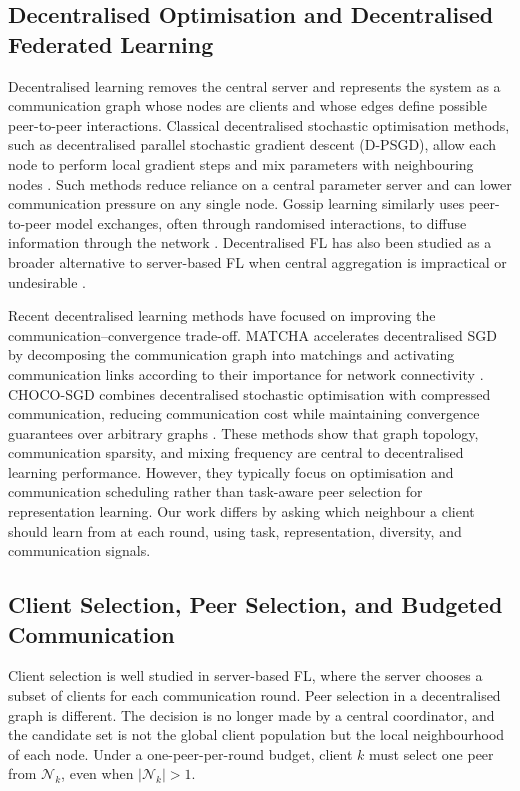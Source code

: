 \documentclass[conference]{IEEEtran}
\begin{document}
\subsection{Decentralised Optimisation and Decentralised Federated Learning}
\label{subsec:decentralised-optimisation-and-decentralised-feder}
Decentralised learning removes the central server and represents the system as a communication graph whose nodes are clients and whose edges define possible peer-to-peer interactions. Classical decentralised stochastic optimisation methods, such as decentralised parallel stochastic gradient descent (D-PSGD), allow each node to perform local gradient steps and mix parameters with neighbouring nodes \cite{lian2017decentralized}. Such methods reduce reliance on a central parameter server and can lower communication pressure on any single node. Gossip learning similarly uses peer-to-peer model exchanges, often through randomised interactions, to diffuse information through the network \cite{ormandi2013gossip,hegedus2019gossip}. Decentralised FL has also been studied as a broader alternative to server-based FL when central aggregation is impractical or undesirable \cite{yuan2023decentralized}.

Recent decentralised learning methods have focused on improving the communication--convergence trade-off. MATCHA accelerates decentralised SGD by decomposing the communication graph into matchings and activating communication links according to their importance for network connectivity \cite{wang2019matcha}. CHOCO-SGD combines decentralised stochastic optimisation with compressed communication, reducing communication cost while maintaining convergence guarantees over arbitrary graphs \cite{koloskova2019choco}. These methods show that graph topology, communication sparsity, and mixing frequency are central to decentralised learning performance. However, they typically focus on optimisation and communication scheduling rather than task-aware peer selection for representation learning. Our work differs by asking which neighbour a client should learn from at each round, using task, representation, diversity, and communication signals.

\subsection{Client Selection, Peer Selection, and Budgeted Communication}
\label{subsec:client-selection-peer-selection-and-communication}
Client selection is well studied in server-based FL, where the server chooses a subset of clients for each communication round. Peer selection in a decentralised graph is different. The decision is no longer made by a central coordinator, and the candidate set is not the global client population but the local neighbourhood of each node. Under a one-peer-per-round budget, client $k$ must select one peer from $\mathcal{N}_k$, even when $|\mathcal{N}_k|>1$.
\end{document}
